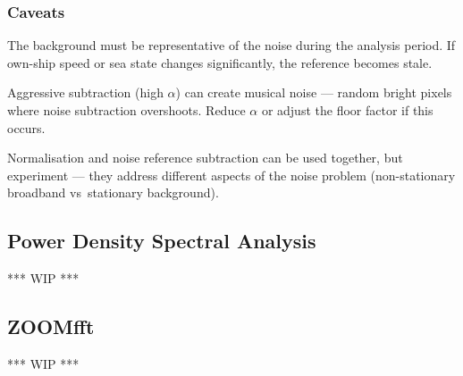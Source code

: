 \subsubsection{Caveats}
\begin{compactitem}
\item The background must be representative of the noise during the analysis period. If own-ship speed or sea state changes significantly, the reference becomes stale.
\item Aggressive subtraction (high $\alpha$) can create musical noise --- random bright pixels where noise subtraction overshoots. Reduce $\alpha$ or adjust the floor factor if this occurs.
\item Normalisation and noise reference subtraction can be used together, but experiment --- they address different aspects of the noise problem (non-stationary broadband vs stationary background).
\end{compactitem}

\subsection{Power Density Spectral Analysis}
\textcolor{commentGreen}{*** WIP ***}

\subsection{ZOOMfft}
\textcolor{commentGreen}{*** WIP ***}

\pagebreak